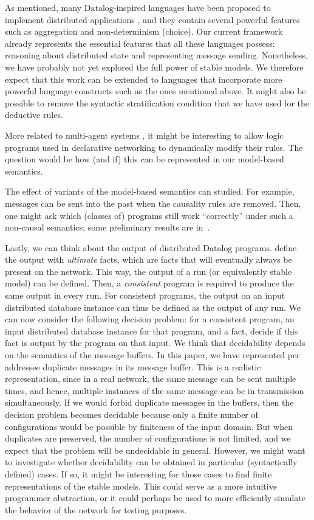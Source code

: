 \documentclass{tlp}
\newcommand{\langname}[1]{\text{#1}}  \newcommand{\pred}[1]{\mathtt{#1}}  \newcommand{\fname}[1]{\mathit{#1}}  \newcommand{\sq}[1]{`{#1}'}
\newcommand{\datalog}{\langname{Datalog}}
\begin{document}
As mentioned, many $\datalog$-inspired languages have been proposed
to implement distributed applications \cite{decl_netw_cacm,declnetw_opsem,grumbach_netlog,webdamlog},
and they contain several powerful features such as aggregation and
non-determinism (choice). Our current framework already represents
the essential features that all these languages possess: reasoning
about distributed state and representing message sending. Nonetheless,
we have probably not yet explored the full power of stable models.
We therefore expect that this work can be extended to languages that
incorporate more powerful language constructs such as the ones mentioned
above. It might also be possible to remove the syntactic stratification
condition that we have used for the deductive rules.

More related to multi-agent systems \cite{leite_minerva,nigam_agents,leite_evolp},
it might be interesting to allow logic programs used in declarative
networking to dynamically modify their rules. The question would be
how (and if) this can be represented in our model-based semantics.

The effect of variants of the model-based semantics can studied. For
example, messages can be sent into the past when the causality rules
are removed. Then, one might ask which (classes of) programs
still work ``correctly'' under such a non-causal semantics; some
preliminary results are in~\cite{ameloot_noncausality2014}.

Lastly, we can think about the output of distributed $\datalog$ programs.
 define the output with
\emph{ultimate} facts, which are facts that will eventually always
be present on the network. This way, the output of a run (or equivalently
stable model) can be defined. Then, a \emph{consistent} program
is required to produce the same output in every run. For consistent
programs, the output on an input distributed database instance can
thus be defined as the output of any run. We can now consider the
following decision problem: for a consistent program, an input distributed
database instance for that program, and a fact, decide if this fact
is output by the program on that input. We think that decidability
depends on the semantics of the message buffers. In this paper, we
have represented per addressee duplicate messages in its message buffer.
This is a realistic representation, since in a real network, the same
message can be sent multiple times, and hence, multiple instances
of the same message can be in transmission simultaneously. If we would
forbid duplicate messages in the buffers, then the decision problem
becomes decidable because only a finite number of configurations would
be possible by finiteness of the input domain. But when duplicates
are preserved, the number of configurations is not limited, and we
expect that the problem will be undecidable in general. However, we
might want to investigate whether decidability can be obtained in
particular (syntactically defined) cases. If so, it might be interesting
for those cases to find finite representations of the stable models.
This could serve as a more intuitive programmer abstraction, or it
could perhaps be used to more efficiently simulate the behavior of
the network for testing purposes.
\end{document}
